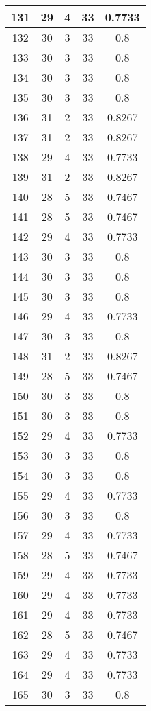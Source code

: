 \documentclass[letterpaper, 12pt]{article}
\begin{document}
\begin{longtable}{|c|c|c|c|c|}
\hline
131 & 29 & 4 & 33 & 0.7733 \\
\hline
132 & 30 & 3 & 33 & 0.8 \\
\hline
133 & 30 & 3 & 33 & 0.8 \\
\hline
134 & 30 & 3 & 33 & 0.8 \\
\hline
135 & 30 & 3 & 33 & 0.8 \\
\hline
136 & 31 & 2 & 33 & 0.8267 \\
\hline
137 & 31 & 2 & 33 & 0.8267 \\
\hline
138 & 29 & 4 & 33 & 0.7733 \\
\hline
139 & 31 & 2 & 33 & 0.8267 \\
\hline
140 & 28 & 5 & 33 & 0.7467 \\
\hline
141 & 28 & 5 & 33 & 0.7467 \\
\hline
142 & 29 & 4 & 33 & 0.7733 \\
\hline
143 & 30 & 3 & 33 & 0.8 \\
\hline
144 & 30 & 3 & 33 & 0.8 \\
\hline
145 & 30 & 3 & 33 & 0.8 \\
\hline
146 & 29 & 4 & 33 & 0.7733 \\
\hline
147 & 30 & 3 & 33 & 0.8 \\
\hline
148 & 31 & 2 & 33 & 0.8267 \\
\hline
149 & 28 & 5 & 33 & 0.7467 \\
\hline
150 & 30 & 3 & 33 & 0.8 \\
\hline
151 & 30 & 3 & 33 & 0.8 \\
\hline
152 & 29 & 4 & 33 & 0.7733 \\
\hline
153 & 30 & 3 & 33 & 0.8 \\
\hline
154 & 30 & 3 & 33 & 0.8 \\
\hline
155 & 29 & 4 & 33 & 0.7733 \\
\hline
156 & 30 & 3 & 33 & 0.8 \\
\hline
157 & 29 & 4 & 33 & 0.7733 \\
\hline
158 & 28 & 5 & 33 & 0.7467 \\
\hline
159 & 29 & 4 & 33 & 0.7733 \\
\hline
160 & 29 & 4 & 33 & 0.7733 \\
\hline
161 & 29 & 4 & 33 & 0.7733 \\
\hline
162 & 28 & 5 & 33 & 0.7467 \\
\hline
163 & 29 & 4 & 33 & 0.7733 \\
\hline
164 & 29 & 4 & 33 & 0.7733 \\
\hline
165 & 30 & 3 & 33 & 0.8 \\

\end{longtable}
\end{document}
